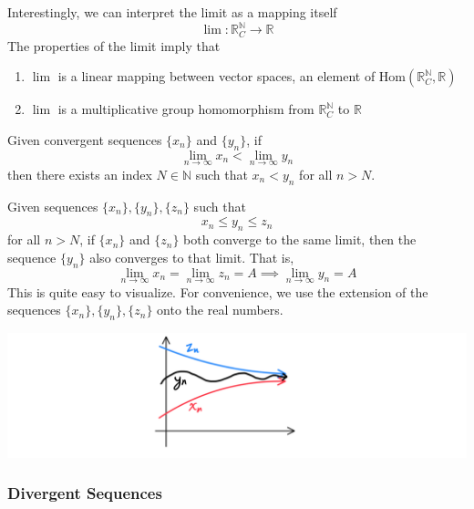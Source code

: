 \documentclass{article}
\begin{document}
      Interestingly, we can interpret the limit as a mapping itself
      \[\lim: \mathbb{R}^\mathbb{N}_C \longrightarrow \mathbb{R}\]
      The properties of the limit imply that 
      \begin{enumerate}
        \item $\lim$ is a linear mapping between vector spaces, an element of Hom$(\mathbb{R}^\mathbb{N}_C, \mathbb{R})$
        \item $\lim$ is a multiplicative group homomorphism from $\mathbb{R}^\mathbb{N}_C$ to $\mathbb{R}$
      \end{enumerate}

      \begin{theorem}
        Given convergent sequences $\{x_n\}$ and $\{y_n\}$, if 
        \[ \lim_{n \rightarrow \infty} x_n < \lim_{n \rightarrow \infty} y_n\]
        then there exists an index $N \in \mathbb{N}$ such that $x_n < y_n$ for all $n > N$. 
      \end{theorem}

      \begin{theorem}
        Given sequences $\{x_n\}, \{y_n\}, \{z_n\}$ such that 
        \[x_n \leq y_n \leq z_n\]
        for all $n > N$, if $\{x_n\}$ and $\{z_n\}$ both converge to the same limit, then the sequence $\{y_n\}$ also converges to that limit. That is, 
        \[\lim_{n \rightarrow \infty} x_n = \lim_{n \rightarrow \infty} z_n = A \implies \lim_{n \rightarrow \infty} y_n = A\]
        This is quite easy to visualize. For convenience, we use the extension of the sequences $\{x_n\}, \{y_n\}, \{z_n\}$ onto the real numbers. 
        \begin{center}
            \includegraphics[scale=0.25]{img/Sequence_Squeeze_Theorem.PNG}
        \end{center}
      \end{theorem}

    \subsubsection{Divergent Sequences}
\end{document}
